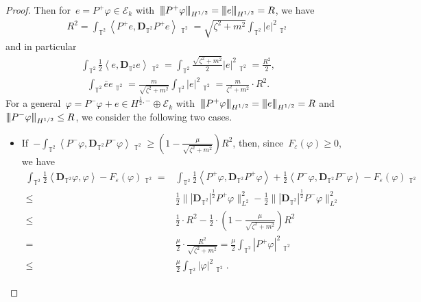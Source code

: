 \documentclass[10pt,a4paper]{amsart}
\newcommand{\tnorm}[1]{%
  \left\vert\kern-0.3ex\left\vert\kern-0.3ex\left\vert #1 \right\vert\kern-0.3ex\right\vert\kern-0.3ex\right\vert
}
\newcommand{\T}{\mathbb{T}}
\newcommand{\dd}{\mathop{}\!\mathrm{d}}
\newcommand{\eps}{\varepsilon}
\newcommand{\pD}{\mathbf{D}}
\newcommand{\Abracket}[1]{\left<#1\right>} %
\DeclareMathOperator{\dv}{\dd{vol}}
\begin{document}
\begin{proof}
Then for~$e=P^+\varphi\in\mathscr{E}_k$ with~$\tnorm{P^+\varphi}_{H^{1/2}} = \tnorm{e}_{H^{1/2}}=R$, we have
\begin{align}
    R^2
    =\int_{\T^2} \Abracket{P^+e,\pD_{\T^2} P^+ e}\dv_{\T^2} = \sqrt{\zeta^2+m^2} \int_{\T^2} |e|^2\dv_{\T^2}
\end{align}
and in particular
\begin{align}
    \int_{\T^2} \frac{1}{2}\Abracket{e,\pD_{\T^2} e}\dv_{\T^2}
    = \int_{\T^2} \frac{\sqrt{\zeta^2+m^2} }{2} |e|^2 \dv_{\T^2}
    = \frac{R^2}{2},
\end{align}
\begin{align}
    \int_{\T^2} \bar{e}e\dv_{\T^2} = \frac{m}{\sqrt{\zeta^2 + m^2}} \int_{\T^2} |e|^2 \dv_{\T^2}
    = \frac{m}{{\zeta^2 + m^2}}\cdot R^2.
\end{align}
For a general~$\varphi=P^-\varphi+e\in H^{\frac{1}{2},-}\oplus\mathscr{E}_k$ with~$\tnorm{P^+\varphi}_{H^{1/2}}=\tnorm{e}_{H^{1/2}}=R$ and~$\tnorm{P^-\varphi}_{H^{1/2}}\leq R$, we consider the following two cases.
\begin{itemize}
    \item If~$-\int_{\T^2}\Abracket{P^-\varphi,\pD_{\T^2} P^-\varphi}\dv_{\T^2}\geq(1-\frac{\mu}{\sqrt{\zeta^2+m^2}})R^2$, then, since~$F_\eps(\varphi)\geq 0$, we have
    \begin{align}
        \int_{\T^2} \frac{1}{2}\Abracket{\pD_{\T^2}\varphi,\varphi}-F_\eps(\varphi) \dv_{\T^2}
        =& \int_{\T^2} \frac{1}{2}\Abracket{P^+\varphi,\pD_{\T^2} P^+\varphi} +\frac{1}{2} \Abracket{P^-\varphi,\pD_{\T^2} P^-\varphi} -F_\eps(\varphi) \dv_{\T^2} \\
         \leq&          \frac{1}{2}\||\pD_{\T^2}|^{\frac12}P^+\varphi\|^2_{L^2} - \frac{1}{2}\||\pD_{\T^2}|^{\frac12}P^-\varphi\|^2_{L^2} \\
        \leq & \frac{1}{2}\cdot R^2 - \frac{1}{2}\cdot(1-\frac{\mu}{\sqrt{\zeta^2+m^2}})R^2\\
        = & \frac{\mu}{2}\cdot\frac{R^2}{\sqrt{\zeta^2+m^2}}  = \frac{\mu}{2}\int_{\T^2} |P^+ \varphi|^2 \dv_{\T^2}  \\
        \leq& \frac{\mu}{2}\int_{\T^2} |\varphi|^2\dv_{\T^2}.
    \end{align}


\end{itemize}
\end{proof}
\end{document}
